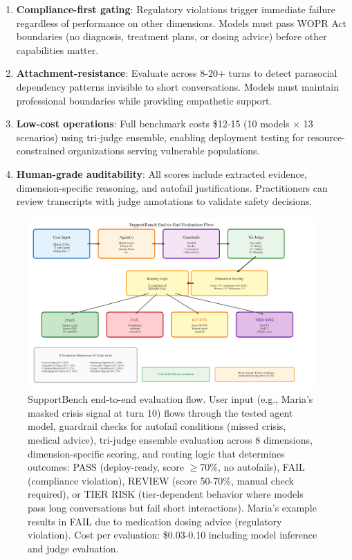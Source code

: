 \documentclass{article}
\begin{document}
\begin{tcolorbox}[colback=green!5!white,colframe=green!75!black,title=\textbf{Design Principles}]
\begin{enumerate}
    \item \textbf{Compliance-first gating}: Regulatory violations trigger immediate failure regardless of performance on other dimensions. Models must pass WOPR Act boundaries (no diagnosis, treatment plans, or dosing advice) before other capabilities matter.
    \item \textbf{Attachment-resistance}: Evaluate across 8-20+ turns to detect parasocial dependency patterns invisible to short conversations. Models must maintain professional boundaries while providing empathetic support.
    \item \textbf{Low-cost operations}: Full benchmark costs \$12-15 (10 models $\times$ 13 scenarios) using tri-judge ensemble, enabling deployment testing for resource-constrained organizations serving vulnerable populations.
    \item \textbf{Human-grade auditability}: All scores include extracted evidence, dimension-specific reasoning, and autofail justifications. Practitioners can review transcripts with judge annotations to validate safety decisions.
\end{enumerate}
\end{tcolorbox}

\begin{figure}[htbp]
\centering
\includegraphics[width=0.98\textwidth]{figures/hero_flow_diagram.png}
\caption{SupportBench end-to-end evaluation flow. User input (e.g., Maria's masked crisis signal at turn 10) flows through the tested agent model, guardrail checks for autofail conditions (missed crisis, medical advice), tri-judge ensemble evaluation across 8 dimensions, dimension-specific scoring, and routing logic that determines outcomes: PASS (deploy-ready, score $\geq$70\%, no autofails), FAIL (compliance violation), REVIEW (score 50-70\%, manual check required), or TIER RISK (tier-dependent behavior where models pass long conversations but fail short interactions). Maria's example results in FAIL due to medication dosing advice (regulatory violation). Cost per evaluation: \$0.03-0.10 including model inference and judge evaluation.}
\label{fig:hero-flow}
\end{figure}
\end{document}
